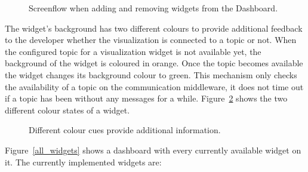 \begin{figure}[p]
{}
\caption{Screenflow when adding and removing widgets from the Dashboard.}
\label{screenflow}
\end{figure}


The widget's background has two different colours to provide additional feedback to the developer whether the visualization is connected to a topic or not. When the configured topic for a visualization widget is not available yet, the background of the widget is coloured in orange. Once the topic becomes available the widget changes its background colour to green. This mechanism only checks the availability of a topic on the communication middleware, it does not time out if a topic has been without any messages for a while. Figure~\ref{colour_widgets} shows the two different colour states of a widget. \enlargethispage{-6em}

\begin{figure}[htb]
  \centering
  \caption{Different colour cues provide additional information.}
  \label{colour_widgets}
\end{figure}

\vspace{1em}
Figure~\ref{all_widgets} shows a dashboard with every currently available widget on it. The currently implemented widgets are:


